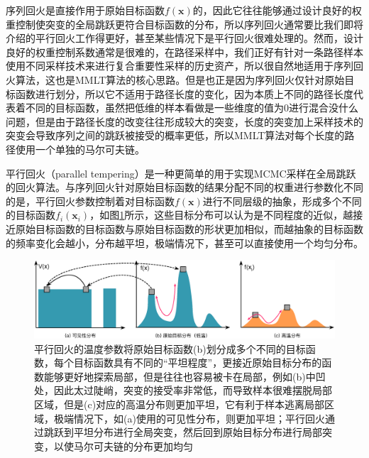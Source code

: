 序列回火是直接作用于原始目标函数$f(\mathbf{x})$的，因此它往往能够通过设计良好的权重控制使突变的全局跳跃更符合目标函数的分布，所以序列回火通常要比我们即将介绍的平行回火工作得更好，甚至某些情况下是平行回火很难处理的\cite{a:AnnealingMarkovChainMonteCarlowithApplicationstoAncestralInference}。然而，设计良好的权重控制系数通常是很难的，在路径采样中，我们正好有针对一条路径样本使用不同采样技术来进行复合重要性采样的历史资产，所以很自然地适用于序列回火算法，这也是MMLT算法的核心思路。但是也正是因为序列回火仅针对原始目标函数进行划分，所以它不适用于路径长度的变化，因为本质上不同的路径长度代表着不同的目标函数，虽然把低维的样本看做是一些维度的值为0进行混合没什么问题，但是由于路径长度的改变往往形成较大的突变，长度的突变加上采样技术的突变会导致序列之间的跳跃被接受的概率更低，所以MMLT算法对每个长度的路径使用一个单独的马尔可夫链。

平行回火（parallel tempering）\cite{a:MarkovChainMonteCarloMaximumLikelihood}是一种更简单的用于实现MCMC采样在全局跳跃的回火算法。与序列回火针对原始目标函数的结果分配不同的权重进行参数化不同的是，平行回火参数控制着对目标函数$f(\mathbf{x})$进行不同层级的抽象，形成多个不同的目标函数$f_i(\mathbf{x}_i)$，如图\ref{f:mlt-parallel-tempering}所示，这些目标分布可以认为是不同程度的近似，越接近原始目标函数的目标函数与原始目标函数的形状更加相似，而越抽象的目标函数的频率变化会越小，分布越平坦，极端情况下，甚至可以直接使用一个均匀分布\cite{a:RobustAdaptivePhotonTracingusingPhotonPathVisibility}。

\begin{figure}
\begin{fullwidth}
\includegraphics[width=1.\thewidth]{figures/mlt/parallel-tempering}
\caption{平行回火的温度参数将原始目标函数(b)划分成多个不同的目标函数，每个目标函数具有不同的“平坦程度”，更接近原始目标分布的函数能够更好地探索局部，但是往往也容易被卡在局部，例如(b)中凹处，因此太过陡峭，突变的接受率非常低，而导致样本很难摆脱局部区域，但是(c)对应的高温分布则更加平坦，它有利于样本逃离局部区域，极端情况下，如(a)使用的可见性分布，则更加平坦；平行回火通过跳跃到平坦分布进行全局突变，然后回到原始目标分布进行局部突变，以使马尔可夫链的分布更加均匀}
\label{f:mlt-parallel-tempering}
\end{fullwidth}
\end{figure}

